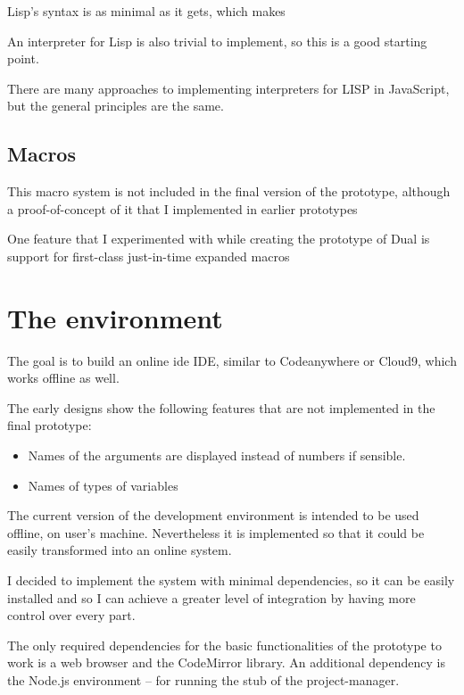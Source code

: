 Lisp's syntax is as minimal as it gets\cite{syntaxation}, which makes 

An interpreter for Lisp is also trivial to implement, so this is a good starting
point.

There are many approaches to implementing interpreters for LISP in
JavaScript\cite{js_lisps}, but the general principles are the same.

\subsection{Macros}
This
macro system is not included in the final version of the prototype, although a
proof-of-concept of it that I implemented in earlier prototypes


One feature that I experimented with while creating the prototype of Dual is
support for first-class just-in-time expanded macros

\section{The environment}

The goal is to build an online \acrlong{ide} IDE, similar to
Codeanywhere\cite{codeanywhere_website} or
Cloud9\cite{c9_website}, which works offline as well.

The early designs show the following features that are not implemented in the
final prototype:
\begin{itemize}
	\item Names of the arguments are displayed instead of numbers if
          sensible.
	\item Names of types of variables
\end{itemize}

The current version of the development environment is intended to be used
offline, on user's machine. Nevertheless it is implemented so that it could be
easily transformed into an online system.

I decided to implement the system with minimal dependencies, so it can be easily
installed and so I can achieve a greater level of integration by having more
control over every part.

The only required dependencies for the basic functionalities of the prototype to
work is a web browser and the CodeMirror library. An additional dependency is the Node.js environment -- for running the stub of the project-manager.


